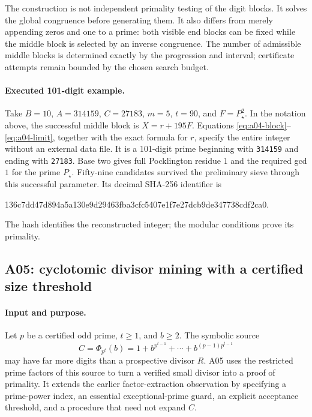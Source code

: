 \documentclass[11pt,a4paper]{article}
\theoremstyle{definition}\newtheorem{definition}[theorem]{Definition}
\theoremstyle{remark}\newtheorem{remark}[theorem]{Remark}
\begin{document}
The construction is not independent primality testing of the digit blocks.
It solves the global congruence before generating them. It also differs
from merely appending zeros and one to a prime: both visible end blocks can
be fixed while the middle block is selected by an inverse congruence.
The number of admissible middle blocks is determined exactly by the
progression and interval; certificate attempts remain bounded by the chosen
search budget.

\paragraph{Executed 101-digit example.}
Take $B=10$, $A=314159$, $C=27183$, $m=5$, $t=90$, and
$F=P_\star^2$. In the notation above, the successful middle block is
$X=r+195F$. Equations \eqref{eq:a04-block}--\eqref{eq:a04-limit}, together
with the exact formula for $r$, specify the entire integer without an
external data file. It is a 101-digit prime beginning with
\texttt{314159} and ending with \texttt{27183}. Base two gives full
Pocklington residue $1$ and the required gcd $1$ for the prime $P_\star$.
Fifty-nine candidates survived the preliminary sieve through this successful
parameter. Its decimal SHA-256 identifier is
\begin{center}\ttfamily\scriptsize
136c7dd47d894a5a130e9d29463fba3cfc5407e1f7e27dcb9de347738cdf2ca0.
\end{center}
The hash identifies the reconstructed integer; the modular conditions prove
its primality.

\subsection{A05: cyclotomic divisor mining with a certified size threshold}
\label{sec:a05}

\paragraph{Input and purpose.}
Let $p$ be a certified odd prime, $t\ge1$, and $b\ge2$. The symbolic source
\[
 C=\Phi_{p^t}(b)
   =1+b^{p^{t-1}}+\cdots+b^{(p-1)p^{t-1}}
\]
may have far more digits than a prospective divisor $R$. A05 uses the
restricted prime factors of this source to turn a verified small divisor
into a proof of primality. It extends the earlier factor-extraction
observation by specifying a prime-power index, an essential exceptional-prime
guard, an explicit acceptance threshold, and a procedure that need not expand $C$.
\end{document}
